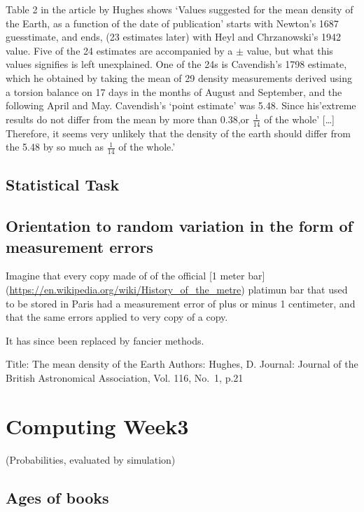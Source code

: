 \documentclass[]{book}
\begin{document}
Table 2 in the article by Hughes shows `Values suggested for the mean density of the Earth, as a function of the date of publication' starts with Newton's 1687 guesstimate, and ends, (23 estimates later) with Heyl and Chrzanowski's 1942 value.
Five of the 24 estimates are accompanied by a \(\pm\) value, but what this values signifies is left unexplained. One of the 24s is Cavendish's 1798 estimate, which he obtained by taking the mean of 29 density measurements derived using a torsion balance on 17 days in the months of August and September, and the following April and May. Cavendish's `point estimate' was 5.48. Since his'extreme results do not differ from the mean by more than 0.38,or \(\frac{1}{14}\) of the whole' {[}\ldots{}{]} Therefore, it seems very unlikely that the density of the earth should differ from the 5.48 by so much as \(\frac{1}{14}\) of the whole.'

\hypertarget{statistical-task-2}{%
\section{Statistical Task}\label{statistical-task-2}}

\hypertarget{orientation-to-random-variation-in-the-form-of-measurement-errors-1}{%
\section{Orientation to random variation in the form of measurement errors}\label{orientation-to-random-variation-in-the-form-of-measurement-errors-1}}

Imagine that every copy made of of the official {[}1 meter bar{]} (\url{https://en.wikipedia.org/wiki/History_of_the_metre}) platimun bar that used to be stored in Paris had a measurement error of plus or minus 1 centimeter, and that the same errors applied to very copy of a copy.

It has since been replaced by fancier methods.

Title: The mean density of the Earth
Authors: Hughes, D.
Journal: Journal of the British Astronomical Association, Vol. 116, No.~1, p.21

\hypertarget{computing03}{%
\chapter{Computing Week3}\label{computing03}}

(Probabilities, evaluated by simulation)

\hypertarget{ages-of-books-1}{%
\section{Ages of books}\label{ages-of-books-1}}
\end{document}
